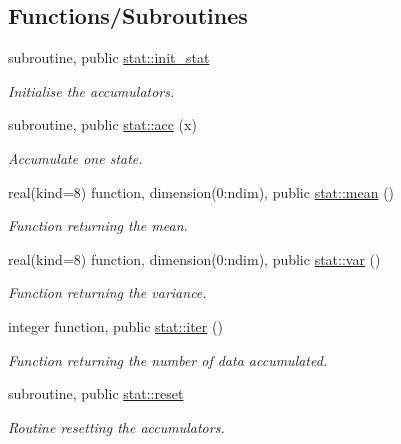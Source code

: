 \subsection*{Functions/\+Subroutines}
\begin{DoxyCompactItemize}
\item 
subroutine, public \hyperlink{namespacestat_a17919a94d519a3b63199ca52590f03c8}{stat\+::init\+\_\+stat}
\begin{DoxyCompactList}\small\item\em Initialise the accumulators. \end{DoxyCompactList}\item 
subroutine, public \hyperlink{namespacestat_a2f642f26a42651e2c0e7275b690deabe}{stat\+::acc} (x)
\begin{DoxyCompactList}\small\item\em Accumulate one state. \end{DoxyCompactList}\item 
real(kind=8) function, dimension(0\+:ndim), public \hyperlink{namespacestat_ada9a5b64e944a67f5b840d7b91990100}{stat\+::mean} ()
\begin{DoxyCompactList}\small\item\em Function returning the mean. \end{DoxyCompactList}\item 
real(kind=8) function, dimension(0\+:ndim), public \hyperlink{namespacestat_a32f0c1c215da5a0f2b92672ddb53dd13}{stat\+::var} ()
\begin{DoxyCompactList}\small\item\em Function returning the variance. \end{DoxyCompactList}\item 
integer function, public \hyperlink{namespacestat_aca30ccb65a1fc6af92be1018ec40f6c6}{stat\+::iter} ()
\begin{DoxyCompactList}\small\item\em Function returning the number of data accumulated. \end{DoxyCompactList}\item 
subroutine, public \hyperlink{namespacestat_aaf88c5c208ce1fac886a9e3c0ee5ae08}{stat\+::reset}
\begin{DoxyCompactList}\small\item\em Routine resetting the accumulators. \end{DoxyCompactList}\end{DoxyCompactItemize}

